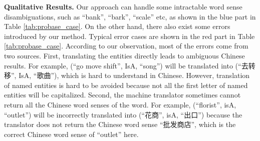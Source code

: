 \textbf{Qualitative Results.}
Our approach can handle some intractable word sense disambiguations, such as ``bank'', ``bark'', ``scale'' etc, as shown in the blue part in Table \ref{tab:probase_case}. On the other hand, there also exist some errors introduced by our method. 
Typical error cases are shown in the red part in Table \ref{tab:probase_case}. According to our observation, most of the errors come from two sources. 
First, translating the entities directly leads to ambiguous Chinese results.
For example, (``go move shift'', IsA, ``song'') will be translated into (``去转移'', IsA, ``歌曲''), which is hard to understand in Chinese. However, translation of named entities is hard to be avoided because not all the first letter of named entities will be capitalized.
Second, the machine translator sometimes cannot return all the Chinese word senses of the word. For example, (``florist'', isA, ``outlet'') will be incorrectly translated into (``花商'', isA, ``出口'') because the translator does not return the Chinese word sense ``批发商店'', which is the correct Chinese word sense of ``outlet'' here.

